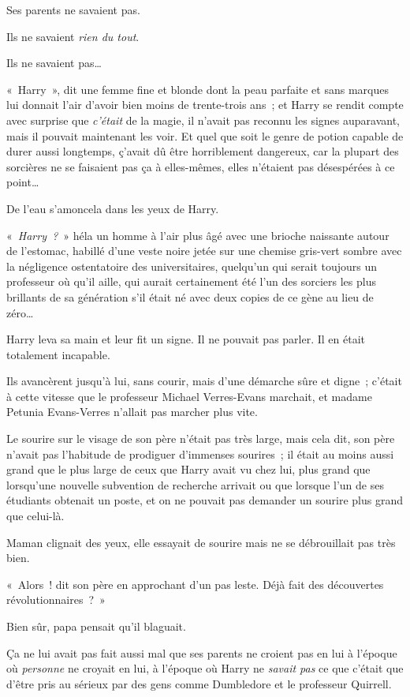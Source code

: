 Ses parents ne savaient pas.

Ils ne savaient \emph{rien du tout}.

Ils ne savaient pas…

«~Harry~», dit une femme fine et blonde dont la peau parfaite et sans marques lui donnait l'air d'avoir bien moins de trente-trois ans~; et Harry se rendit compte avec surprise que \emph{c'était} de la magie, il n'avait pas reconnu les signes auparavant, mais il pouvait maintenant les voir.
Et quel que soit le genre de potion capable de durer aussi longtemps, ç'avait dû être horriblement dangereux, car la plupart des sorcières ne se faisaient pas ça à elles-mêmes, elles n'étaient pas désespérées à ce point…

De l'eau s'amoncela dans les yeux de Harry.

«~\emph{Harry~?}~» héla un homme à l'air plus âgé avec une brioche naissante autour de l'estomac, habillé d'une veste noire jetée sur une chemise gris-vert sombre avec la négligence ostentatoire des universitaires, quelqu'un qui serait toujours un professeur où qu'il aille, qui aurait certainement été l'un des sorciers les plus brillants de sa génération s'il était né avec deux copies de ce gène au lieu de zéro…

Harry leva sa main et leur fit un signe.
Il ne pouvait pas parler.
Il en était totalement incapable.

Ils avancèrent jusqu'à lui, sans courir, mais d'une démarche sûre et digne~; c'était à cette vitesse que le professeur Michael Verres-Evans marchait, et madame Petunia Evans-Verres n'allait pas marcher plus vite.

Le sourire sur le visage de son père n'était pas très large, mais cela dit, son père n'avait pas l'habitude de prodiguer d'immenses sourires~; il était au moins aussi grand que le plus large de ceux que Harry avait vu chez lui, plus grand que lorsqu'une nouvelle subvention de recherche arrivait ou que lorsque l'un de ses étudiants obtenait un poste, et on ne pouvait pas demander un sourire plus grand que celui-là.

Maman clignait des yeux, elle essayait de sourire mais ne se débrouillait pas très bien.

«~Alors~! dit son père en approchant d'un pas leste.
Déjà fait des découvertes révolutionnaires~?~»

Bien sûr, papa pensait qu'il blaguait.

Ça ne lui avait pas fait aussi mal que ses parents ne croient pas en lui à l'époque où \emph{personne} ne croyait en lui, à l'époque où Harry ne \emph{savait pas} ce que c'était que d'être pris au sérieux par des gens comme Dumbledore et le professeur Quirrell.

